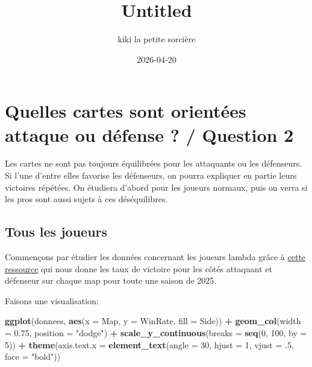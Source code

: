 \documentclass[
]{article}
\title{Untitled}
\author{kiki la petite sorcière}
\date{2026-04-20}
\newenvironment{Shaded}{\begin{snugshade}}{\end{snugshade}}
\newcommand{\AttributeTok}[1]{\textcolor[rgb]{0.13,0.29,0.53}{#1}}
\newcommand{\DecValTok}[1]{\textcolor[rgb]{0.00,0.00,0.81}{#1}}
\newcommand{\FloatTok}[1]{\textcolor[rgb]{0.00,0.00,0.81}{#1}}
\newcommand{\FunctionTok}[1]{\textcolor[rgb]{0.13,0.29,0.53}{\textbf{#1}}}
\newcommand{\NormalTok}[1]{#1}
\newcommand{\SpecialCharTok}[1]{\textcolor[rgb]{0.81,0.36,0.00}{\textbf{#1}}}
\newcommand{\StringTok}[1]{\textcolor[rgb]{0.31,0.60,0.02}{#1}}
\begin{document}
\maketitle

\section{Quelles cartes sont orientées attaque ou défense ? / Question
2}\label{quelles-cartes-sont-orientuxe9es-attaque-ou-duxe9fense-question-2}

Les cartes ne sont pas toujours équilibrées pour les attaquants ou les
défenseurs. Si l'une d'entre elles favorise les défenseurs, on pourra
expliquer en partie leurs victoires répétées. On étudiera d'abord pour
les joueurs normaux, puis on verra si les pros sont aussi sujets à ces
déséquilibres.

\subsection{Tous les joueurs}\label{tous-les-joueurs}

Commençons par étudier les données concernant les joueurs lambda grâce à
\href{https://blitz.gg/valorant/stats/maps?act=ev25actvi}{cette
ressource} qui nous donne les taux de victoire pour les côtés attaquant
et défenseur sur chaque map pour toute une saison de 2025.

Faisons une visualisation:

\begin{Shaded}
\begin{Highlighting}[]
\FunctionTok{ggplot}\NormalTok{(donnees, }\FunctionTok{aes}\NormalTok{(}\AttributeTok{x =}\NormalTok{ Map, }\AttributeTok{y =}\NormalTok{ WinRate, }\AttributeTok{fill =}\NormalTok{ Side)) }\SpecialCharTok{+}
  \FunctionTok{geom\_col}\NormalTok{(}\AttributeTok{width =} \FloatTok{0.75}\NormalTok{, }\AttributeTok{position =} \StringTok{"dodge"}\NormalTok{) }\SpecialCharTok{+}
  \FunctionTok{scale\_y\_continuous}\NormalTok{(}\AttributeTok{breaks =} \FunctionTok{seq}\NormalTok{(}\DecValTok{0}\NormalTok{, }\DecValTok{100}\NormalTok{, }\AttributeTok{by =} \DecValTok{5}\NormalTok{)) }\SpecialCharTok{+}
  \FunctionTok{theme}\NormalTok{(}\AttributeTok{axis.text.x =} \FunctionTok{element\_text}\NormalTok{(}\AttributeTok{angle =} \DecValTok{30}\NormalTok{, }\AttributeTok{hjust =} \DecValTok{1}\NormalTok{, }\AttributeTok{vjust =}\NormalTok{ .}\DecValTok{5}\NormalTok{, }\AttributeTok{face =} \StringTok{"bold"}\NormalTok{))}
\end{Highlighting}
\end{Shaded}
\end{document}

